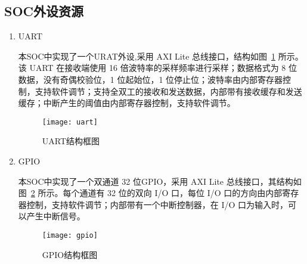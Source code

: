 \subsection{SOC外设资源}
\begin{enumerate}
    \item UART 

    本SOC中实现了一个URAT外设,采用 AXI Lite 总线接口，结构如图~\ref{fig:uart} 所示。该 UART 在接收端使用 16 倍波特率的采样频率进行采样；数据格式为 8 位数据，没有奇偶校验位，1 位起始位，1 位停止位；波特率由内部寄存器控制，支持软件调节；支持全双工的接收和发送数据，内部带有接收缓存和发送缓存；中断产生的阈值由内部寄存器控制，支持软件调节。
    
    \begin{figure}[htbp]
        \centering
        \texttt{[image: uart]}
        \caption{UART结构框图}
        \label{fig:uart}
    \end{figure}
    
    
    \item GPIO
    
    本SOC中实现了一个双通道 32 位GPIO，采用 AXI Lite 总线接口，其结构如图~\ref{fig:gpio} 所示。每个通道有 32 位的双向 I/O 口，每位 I/O 口的方向由内部寄存器控制，支持软件调节；内部带有一个中断控制器，在 I/O 口为输入时，可以产生中断信号。
    
    \begin{figure}[htbp]
        \centering
        \texttt{[image: gpio]}
        \caption{GPIO结构框图}
        \label{fig:gpio}
    \end{figure}
    
    

\end{enumerate}
